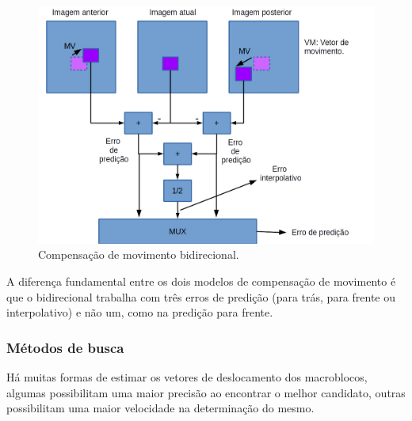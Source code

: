 \begin{figure}[!ht]
\begin{center}
\includegraphics[scale=0.5]{./Figures/png/bidirectional_prediction.png}
\caption{Compensação de movimento bidirecional.}
\label{fig:bidirectional_prediction}
\end{center}
\end{figure}

A diferença fundamental entre os dois modelos de compensação de movimento é que o bidirecional trabalha com três erros de predição (para trás, para frente ou interpolativo) e não um, como na predição para frente. 

\subsubsection{Métodos de busca}

Há muitas formas de estimar os vetores de deslocamento dos macroblocos, algumas possibilitam uma maior precisão ao encontrar o melhor candidato, outras possibilitam uma maior velocidade na determinação do mesmo.

